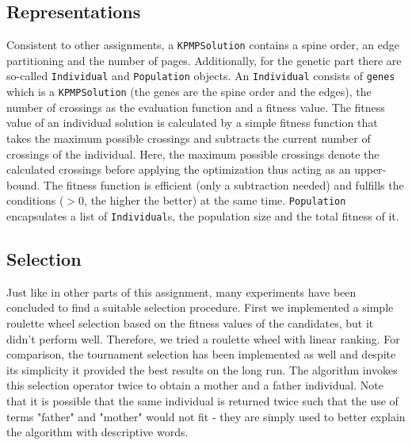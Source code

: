 \documentclass[11pt]{article}
\begin{document}
\subsection{Representations}
\hspace{0.5cm}Consistent to other assignments, a \texttt{KPMPSolution} contains a spine order, an edge partitioning and the number of pages. Additionally, for the genetic part there are so-called \texttt{Individual} and \texttt{Population} objects. An \texttt{Individual} consists of \texttt{genes} which is a \texttt{KPMPSolution} (the genes are the spine order and the edges), the number of crossings as the evaluation function and a fitness value. The fitness value of an individual solution is calculated by a simple fitness function that takes the maximum possible crossings and subtracts the current number of crossings of the individual. Here, the maximum possible crossings denote the calculated crossings before applying the optimization thus acting as an upper-bound. The fitness function is efficient (only a subtraction needed) and fulfills the conditions ($>0$, the higher the better) at the same time. \texttt{Population} encapsulates a list of \texttt{Individual}s, the population size and the total fitness of it.
\subsection{Selection}
\hspace{0.5cm} Just like in other parts of this assignment, many experiments have been concluded to find a suitable selection procedure. First we implemented a simple roulette wheel selection based on the fitness values of the candidates, but it didn't perform well. Therefore, we tried a roulette wheel with linear ranking. For comparison, the tournament selection has been implemented as well and despite its simplicity it provided the best results on the long run. The algorithm invokes this selection operator twice to obtain a mother and a father individual. Note that it is possible that the same individual is returned twice such that the use of terms "father" and "mother" would not fit - they are simply used to better explain the algorithm with descriptive words.
\end{document}
